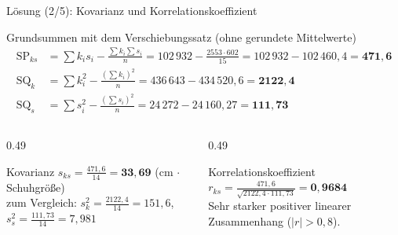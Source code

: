 \documentclass[aspectratio=169,11pt]{beamer}
\newcommand{\SQk}{\text{SQ}_k}
\newcommand{\SQs}{\text{SQ}_s}
\newcommand{\SPks}{\text{SP}_{ks}}
\begin{document}
\begin{frame}{Lösung (2/5): Kovarianz und Korrelationskoeffizient}
  \begin{block}{Grundsummen mit dem Verschiebungssatz (ohne gerundete Mittelwerte)}
    \vspace{-8pt}
    \begin{align*}
      \SPks &= \textstyle\sum k_i s_i - \frac{\sum k_i \sum s_i}{n} = 102\,932 - \frac{2553 \cdot 602}{15} = 102\,932 - 102\,460{,}4 = \mathbf{471{,}6} \\
      \SQk  &= \textstyle\sum k_i^{2} - \frac{(\sum k_i)^{2}}{n} = 436\,643 - 434\,520{,}6 = \mathbf{2122{,}4} \\
      \SQs  &= \textstyle\sum s_i^{2} - \frac{(\sum s_i)^{2}}{n} = 24\,272 - 24\,160{,}27 = \mathbf{111{,}73}
    \end{align*}
    \vspace{-14pt}
  \end{block}

  \begin{columns}[T]
    \begin{column}{0.49\textwidth}
      \begin{exampleblock}{Kovarianz}
        $s_{ks} = \frac{471{,}6}{14} = \mathbf{33{,}69}$ (cm $\cdot$ Schuhgröße)\\[2pt]
        \footnotesize zum Vergleich: $s_k^{2} = \frac{2122{,}4}{14} = 151{,}6$, \
        $s_s^{2} = \frac{111{,}73}{14} = 7{,}981$
      \end{exampleblock}
    \end{column}
    \begin{column}{0.49\textwidth}
      \begin{exampleblock}{Korrelationskoeffizient}
        $r_{ks} = \frac{471{,}6}{\sqrt{2122{,}4 \cdot 111{,}73}} = \mathbf{0{,}9684}$\\[2pt]
        \footnotesize Sehr starker positiver linearer Zusammenhang
        ($|r| > 0{,}8$).
      \end{exampleblock}
    \end{column}
  \end{columns}
\end{frame}
\end{document}
